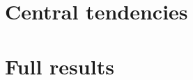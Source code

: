 \documentclass[a4paper,11pt]{article}
\begin{document}
\section{Central tendencies}



\section{Full results}


\end{document}
